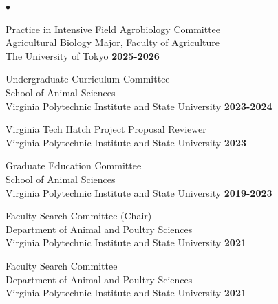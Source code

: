 \documentclass[margin,line,10pt]{res}
\newenvironment{list2}{
  \begin{list}{$\bullet$}{%
      \setlength{\itemsep}{0in}
      \setlength{\parsep}{0in} \setlength{\parskip}{0in}
      \setlength{\topsep}{0in} \setlength{\partopsep}{0in} 
      \setlength{\leftmargin}{0.2in}}}{\end{list}}
\begin{document}
\begin{resume}
\begin{list2}
  \item Practice in Intensive Field Agrobiology Committee  \\ %
  Agricultural Biology Major, Faculty of Agriculture  \\ The University of Tokyo   \hfill \textbf{2025-2026}\\

  \vspace{0.3cm}


  \item Undergraduate Curriculum Committee \\
  School of Animal Sciences \\ Virginia Polytechnic Institute and State University   \hfill \textbf{2023-2024}\\

  \vspace{0.3cm}

  \item  Virginia Tech Hatch Project Proposal Reviewer \\
  Virginia Polytechnic Institute and State University  \hfill \textbf{2023}  \\

  \vspace{0.3cm}


  \item Graduate Education Committee \\
  School of Animal Sciences \\ Virginia Polytechnic Institute and State University   \hfill \textbf{2019-2023}\\

  \vspace{0.3cm}

  \item Faculty Search Committee (Chair) \\
  Department of Animal and Poultry Sciences \\ Virginia Polytechnic Institute and State University   \hfill \textbf{2021}\\

  
  \vspace{0.3cm}

   \item  Faculty Search Committee \\
  Department of Animal and Poultry Sciences \\ Virginia Polytechnic Institute and State University   \hfill \textbf{2021}\\


\end{list2}
\end{resume}
\end{document}
